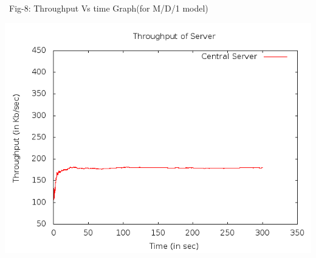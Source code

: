 \documentclass[a4paper,12pt]{report}
\begin{document}
\noindent \\\\\\\\\\\\\\\\\\\\\
\noindent Fig-8: Throughput Vs time Graph(for M/D/1 model)
\begin{center}
 \includegraphics[width=12 cm,height=12 cm]{../problem2/throughput.png}
\end{center}
\end{document}
